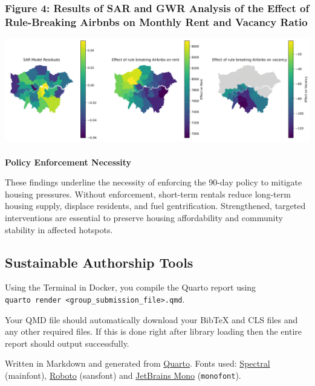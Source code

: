 \documentclass[
  a4paper,
  DIV=11,
  numbers=noendperiod]{scrartcl}
\makeatletter
\let\oldparagraph\paragraph
\renewcommand{\paragraph}{
    \@ifstar
      \xxxParagraphStar
      \xxxParagraphNoStar
  }
\newcommand{\xxxParagraphStar}[1]{\oldparagraph*{#1}\mbox{}}
\newcommand{\xxxParagraphNoStar}[1]{\oldparagraph{#1}\mbox{}}
\makeatother
\begin{document}
\subsubsection{Figure 4: Results of SAR and GWR Analysis of the Effect
of Rule-Breaking Airbnbs on Monthly Rent and Vacancy
Ratio}\label{figure-4-results-of-sar-and-gwr-analysis-of-the-effect-of-rule-breaking-airbnbs-on-monthly-rent-and-vacancy-ratio}

\includegraphics{plots/Results_of_SAR_and_GWR_model.png}

\paragraph{\texorpdfstring{\textbf{Policy Enforcement
Necessity}}{Policy Enforcement Necessity}}\label{policy-enforcement-necessity}

These findings underline the necessity of enforcing the 90-day policy to
mitigate housing pressures. Without enforcement, short-term rentals
reduce long-term housing supply, displace residents, and fuel
gentrification. Strengthened, targeted interventions are essential to
preserve housing affordability and community stability in affected
hotspots.

\subsection{Sustainable Authorship
Tools}\label{sustainable-authorship-tools}

Using the Terminal in Docker, you compile the Quarto report using
\texttt{quarto\ render\ \textless{}group\_submission\_file\textgreater{}.qmd}.

Your QMD file should automatically download your BibTeX and CLS files
and any other required files. If this is done right after library
loading then the entire report should output successfully.

Written in Markdown and generated from
\href{https://quarto.org/}{Quarto}. Fonts used:
\href{https://fonts.google.com/specimen/Spectral}{Spectral} (mainfont),
\href{https://fonts.google.com/specimen/Roboto}{Roboto} ({sansfont}) and
\href{https://fonts.google.com/specimen/JetBrains\%20Mono}{JetBrains
Mono} (\texttt{monofont}).
\end{document}
